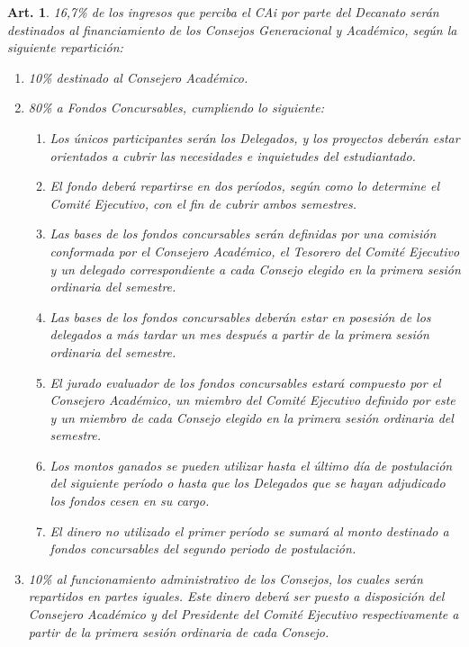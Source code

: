 \documentclass[letterpaper,11pt]{article}
\theoremstyle{plain}
\newtheorem{art}{Art.} %
\begin{document}
		\begin{art}
			16,7\% de los ingresos que perciba el CAi por parte del Decanato serán destinados al financiamiento de los Consejos Generacional y Académico, según la siguiente repartición:
			\begin{enumerate}
				\item 10\% destinado al Consejero Académico.
				\item 80\% a Fondos Concursables, cumpliendo lo siguiente:
					\begin{enumerate}
						\item Los únicos participantes serán los Delegados, y los proyectos deberán estar orientados a cubrir las necesidades e inquietudes del estudiantado.
						\item El fondo deberá repartirse en dos períodos, según como lo determine el Comité Ejecutivo, con el fin de cubrir ambos semestres.
						\item Las bases de los fondos concursables serán definidas por una comisión conformada por el Consejero Académico, el Tesorero del Comité Ejecutivo y un delegado correspondiente  a cada Consejo elegido en la primera sesión ordinaria del semestre.
						\item Las bases de los fondos concursables deberán estar en posesión de los delegados a más tardar un mes después a partir de la primera sesión ordinaria del semestre.
						\item El jurado evaluador de los fondos concursables estará compuesto por el Consejero Académico, un miembro del Comité Ejecutivo definido por este y un  miembro de cada Consejo elegido en la primera sesión ordinaria del semestre.
						\item Los montos ganados se pueden utilizar hasta el último día de postulación del siguiente período o hasta que los Delegados que se hayan adjudicado los fondos cesen en su cargo.
						\item El dinero no utilizado el primer período se sumará al monto destinado a fondos concursables del segundo periodo de postulación.
					\end{enumerate}
				\item 10\% al funcionamiento administrativo de los Consejos, los cuales serán repartidos en partes iguales. Este dinero deberá ser puesto a disposición del Consejero Académico y del Presidente del Comité Ejecutivo respectivamente a partir de la primera sesión ordinaria de cada Consejo.
			\end{enumerate}
		\end{art}
\end{document}
